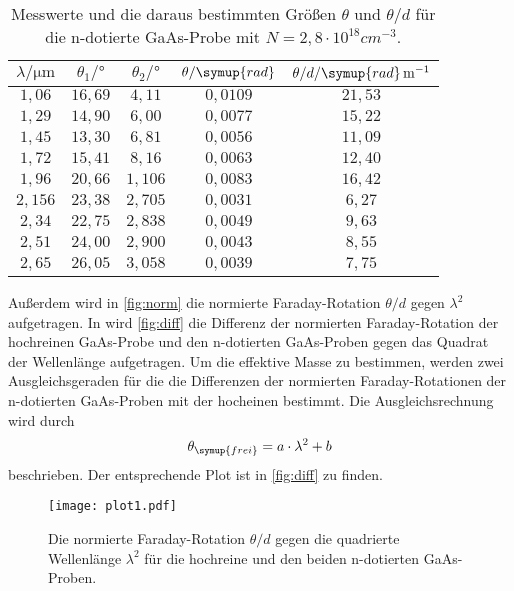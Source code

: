 \begin{table}[hbt!]
  \centering
  \caption{Messwerte und die daraus bestimmten Größen $\theta$ und $\theta/d$ für die n-dotierte GaAs-Probe
  mit $N=2,8 \cdot 10^{18} \si{cm}^{-3}$.}
  \label{tab:m3}
  \begin{tabular}{c c c c c}
    \toprule
    $\lambda/\si{\micro\meter}$ & $\theta_{1}/\si{\degree}$ & $\theta_{2}/\si{\degree}$ & $\theta/\symup{rad}$ & $\theta/d/\symup{rad}\, \si{m}^{-1}$\\
    \midrule
    $1,06 $ & $16,69$ & $4,11$  & $0,0109$ & $21,53$ \\
    $1,29 $ & $14,90$ & $6,00$  & $0,0077$ & $15,22$ \\
    $1,45 $ & $13,30$ & $6,81$  & $0,0056$ & $11,09$ \\
    $1,72 $ & $15,41$ & $8,16$  & $0,0063$ & $12,40$ \\
    $1,96 $ & $20,66$ & $1,106$ & $0,0083$ & $16,42$ \\
    $2,156$ & $23,38$ & $2,705$ & $0,0031$ & $ 6,27$ \\
    $2,34 $ & $22,75$ & $2,838$ & $0,0049$ & $ 9,63$ \\
    $2,51 $ & $24,00$ & $2,900$ & $0,0043$ & $ 8,55$ \\
    $2,65 $ & $26,05$ & $3,058$ & $0,0039$ & $ 7,75$ \\
    \bottomrule
  \end{tabular}
\end{table}
Außerdem wird in \autoref{fig:norm} die normierte Faraday-Rotation $\theta/d$ gegen $\lambda^2$ aufgetragen.
In wird \autoref{fig:diff} die Differenz der normierten Faraday-Rotation der hochreinen GaAs-Probe und den n-dotierten GaAs-Proben
gegen das Quadrat der Wellenlänge aufgetragen. Um die effektive Masse zu bestimmen, werden zwei Ausgleichsgeraden
für die die Differenzen der normierten Faraday-Rotationen der n-dotierten GaAs-Proben mit der hocheinen bestimmt.
Die Ausgleichsrechnung wird durch
\begin{align*}
  \theta_{\symup{frei}} = a\cdot \lambda^2 + b
\end{align*}
beschrieben.
Der entsprechende Plot ist in \autoref{fig:diff} zu finden.
\begin{figure}[hbt!]
  \texttt{[image: plot1.pdf]}
  \caption{Die normierte Faraday-Rotation $\theta/d$ gegen die quadrierte Wellenlänge $\lambda^2$ für die
  hochreine und den beiden n-dotierten GaAs-Proben.}
  \label{fig:norm}
\end{figure}

